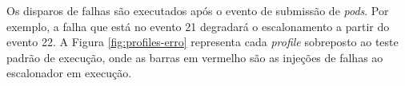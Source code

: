 Os disparos de falhas são executados após o evento de submissão de \textit{pods}. Por exemplo, a falha que está no evento 21 degradará o escalonamento a partir do evento 22. A Figura \ref{fig:profiles-erro} representa cada \textit{profile} sobreposto ao teste padrão de execução, onde as barras em vermelho são as injeções de falhas ao escalonador em execução.

